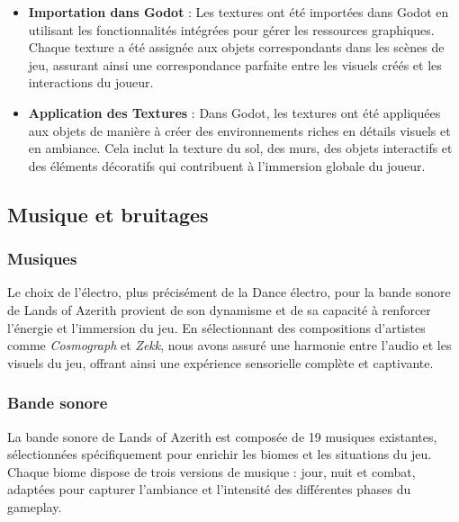 \begin{itemize}
    \item \textbf{Importation dans Godot} : Les textures ont été importées dans Godot en utilisant les fonctionnalités intégrées pour gérer les ressources graphiques. Chaque texture a été assignée aux objets correspondants dans les scènes de jeu, assurant ainsi une correspondance parfaite entre les visuels créés et les interactions du joueur.
    \\

    \item \textbf{Application des Textures} : Dans Godot, les textures ont été appliquées aux objets de manière à créer des environnements riches en détails visuels et en ambiance. Cela inclut la texture du sol, des murs, des objets interactifs et des éléments décoratifs qui contribuent à l'immersion globale du joueur.
\end{itemize}








\subsection{Musique et bruitages}

\subsubsection{Musiques}

Le choix de l'électro, plus précisément de la Dance électro, pour la bande sonore de Lands of Azerith provient de son dynamisme et de sa capacité à renforcer l'énergie et l'immersion du jeu.
En sélectionnant des compositions d'artistes comme \textit{Cosmograph} et \textit{Zekk}, nous avons assuré une harmonie entre l'audio et les visuels du jeu, offrant ainsi une expérience sensorielle complète et captivante.

\subsubsection{Bande sonore}

La bande sonore de Lands of Azerith est composée de 19 musiques existantes, sélectionnées spécifiquement pour enrichir les biomes et les situations du jeu.
\\

Chaque biome dispose de trois versions de musique : jour, nuit et combat, adaptées pour capturer l'ambiance et l'intensité des différentes phases du gameplay.
\\

